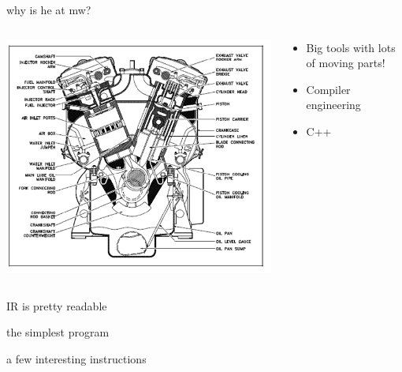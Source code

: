 \documentclass{beamer}
\begin{document}
\begin{frame}{why is he at mw?}
  \begin{columns}
    \begin{column}[b]{3.5cm}
      \includegraphics[scale=0.3]{engine-internals}
    \end{column}
    \begin{column}[b]{6.5cm}
      \begin{itemize}
      \item[] Big tools with lots of moving parts!
      \item[] Compiler engineering
      \item[] C++
      \end{itemize}
    \end{column}
  \end{columns}
\end{frame}

\begin{frame}{IR is pretty readable}
  
  
\end{frame}

\begin{frame}{the simplest program}
  
  
\end{frame}

\begin{frame}{a few interesting instructions}
  
  
\end{frame}
\end{document}
